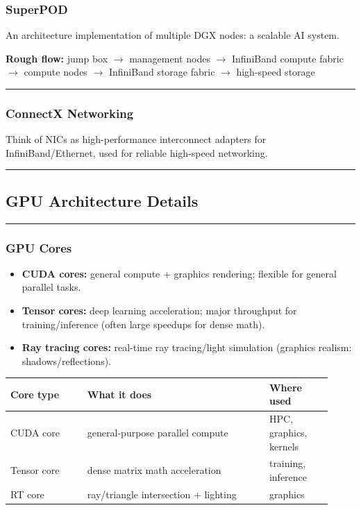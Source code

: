 \documentclass[11pt]{article}
\newcommand{\blue}[1]{\textcolor{myblue}{#1}}
\newcommand{\notespace}{
\vspace{0.8cm}
\hrule
\vspace{0.8cm}
}
\newcommand{\term}[1]{\blue{\textbf{#1}}}
\begin{document}
\subsubsection{SuperPOD}
An architecture implementation of multiple DGX nodes: a scalable AI system.

\textbf{Rough flow:} jump box $\rightarrow$ management nodes $\rightarrow$ InfiniBand compute fabric $\rightarrow$ compute nodes $\rightarrow$ InfiniBand storage fabric $\rightarrow$ high-speed storage
\notespace

\subsubsection{ConnectX Networking}
Think of NICs as high-performance interconnect adapters for InfiniBand/Ethernet, used for reliable high-speed networking.
\notespace

\subsection{GPU Architecture Details}
\notespace

\subsubsection{GPU Cores}
\begin{itemize}
\item \term{CUDA cores:} general compute + graphics rendering; flexible for general parallel tasks.
\item \term{Tensor cores:} deep learning acceleration; major throughput for training/inference (often large speedups for dense math).
\item \term{Ray tracing cores:} real-time ray tracing/light simulation (graphics realism: shadows/reflections).
\end{itemize}

\begin{center}
\renewcommand{\arraystretch}{1.15}
\begin{tabular}{|p{0.22\linewidth}|p{0.52\linewidth}|p{0.18\linewidth}|}
\hline
\textbf{Core type} & \textbf{What it does} & \textbf{Where used} \\
\hline
CUDA core & general-purpose parallel compute & HPC, graphics, kernels \\
\hline
Tensor core & dense matrix math acceleration & training, inference \\
\hline
RT core & ray/triangle intersection + lighting & graphics \\
\hline
\end{tabular}
\end{center}
\end{document}
